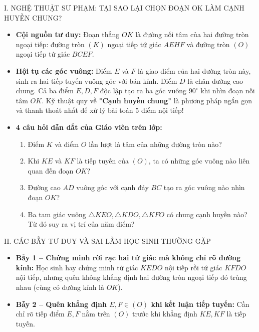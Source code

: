 \documentclass[11pt,a4paper]{article}
\begin{document}
\vspace{1mm}

\begin{pedagogybox}{I. NGHỆ THUẬT SƯ PHẠM: TẠI SAO LẠI CHỌN ĐOẠN OK LÀM CẠNH HUYỀN CHUNG?}
\begin{itemize}[leftmargin=*]
    \item \textbf{Cội nguồn tư duy:} Đoạn thẳng $OK$ là đường nối tâm của hai đường tròn ngoại tiếp: đường tròn $(K)$ ngoại tiếp tứ giác $AEHF$ và đường tròn $(O)$ ngoại tiếp tứ giác $BCEF$.
    \item \textbf{Hội tụ các góc vuông:} Điểm $E$ và $F$ là giao điểm của hai đường tròn này, sinh ra hai tiếp tuyến vuông góc với bán kính. Điểm $D$ là chân đường cao chung. Cả ba điểm $E, D, F$ độc lập tạo ra ba góc vuông $90^\circ$ khi nhìn đoạn nối tâm $OK$. Kỹ thuật quy về \textbf{"Cạnh huyền chung"} là phương pháp ngắn gọn và thanh thoát nhất để xử lý bài toán 5 điểm nội tiếp!
    \item \textbf{4 câu hỏi dẫn dắt của Giáo viên trên lớp:}
    \begin{enumerate}[label=\arabic*., nosep]
        \item Điểm $K$ và điểm $O$ lần lượt là tâm của những đường tròn nào?
        \item Khi $KE$ và $KF$ là tiếp tuyến của $(O)$, ta có những góc vuông nào liên quan đến đoạn $OK$?
        \item Đường cao $AD$ vuông góc với cạnh đáy $BC$ tạo ra góc vuông nào nhìn đoạn $OK$?
        \item Ba tam giác vuông $\triangle KEO, \triangle KDO, \triangle KFO$ có chung cạnh huyền nào? Từ đó suy ra vị trí của năm điểm?
    \end{enumerate}
\end{itemize}
\end{pedagogybox}

\vspace{1mm}

\begin{pedagogybox}{II. CÁC BẪY TƯ DUY VÀ SAI LẦM HỌC SINH THƯỜNG GẶP}
\begin{itemize}[leftmargin=*, nosep]
    \item \textbf{Bẫy 1 -- Chứng minh rời rạc hai tứ giác mà không chỉ rõ đường kính:} Học sinh hay chứng minh tứ giác $KEDO$ nội tiếp rồi tứ giác $KFDO$ nội tiếp, nhưng quên không khẳng định hai đường tròn ngoại tiếp đó trùng nhau (cùng có đường kính là $OK$).
    \item \textbf{Bẫy 2 -- Quên khẳng định $E, F \in (O)$ khi kết luận tiếp tuyến:} Cần chỉ rõ tiếp điểm $E, F$ nằm trên $(O)$ trước khi khẳng định $KE, KF$ là tiếp tuyến.
\end{itemize}
\end{pedagogybox}
\end{document}
